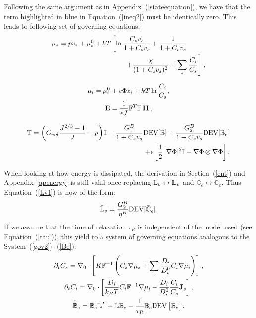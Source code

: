 Following the same argument as in Appendix~(\ref{stateequation}), we have that the term highlighted in blue in Equation~(\ref{ineq2}) must be identically zero. This leads to following set of governing equations:
\begin{gather}
\begin{aligned}
\mu_s = p v_s + \mu_s^0 + kT&\left[\ln \frac{C_s v_s}{1+C_s v_s} + \frac{1}{1+C_sv_s}\right.\\
&\left.\ \ \ \ \ \ +\frac{\chi}{(1+C_s v_s)^2}-\sum_i \frac{C_i}{C_s}\right], 
\end{aligned}\\[2.5mm]
\mu_i = \mu^0_i + e\Phi z_i + kT \ln \frac{C_i}{C_s},\\
\mathbf{E} = \frac{1}{\epsilon J} \mathbb{F}^T \mathbb{F}\, \mathbf{H}\,, \\[3mm]
\begin{aligned}
\mathbb{T}= \left(G_{vol}\dfrac{J^{2/3}-1}{J}-p\right) \mathbb{I} + \frac{G^B_1}{1+C_sv_s}\text{DEV}[\bar{\mathbb{B}}] + \frac{G^B_2}{1+C_sv_s}\text{DEV}[\bar{\mathbb{B}}_e]\\
+ \epsilon \left[\frac{1}{2} \,|\nabla \Phi|^2\mathbb{I} -\nabla \Phi \otimes \nabla \Phi\right],\label{sys2B}
\end{aligned}
\end{gather}

When looking at how energy is dissipated, the derivation in Section~(\ref{ent}) and Appendix~\ref{apenergy} is still valid once replacing $\mathbb{L}_v\leftrightarrow \bar{\mathbb{L}}_v$ and $\mathbb{C}_e\leftrightarrow\mathbb{\bar{C}}_e$. Thus Equation~(\ref{Lv1}) is now of the form:
\begin{equation}
\bar{\mathbb{L}}_v = \frac{G^B_2}{\eta^B} \text{DEV}[\bar{\mathbb{C}}_e].\label{Lv2}
\end{equation}
If we assume that the time of relaxation $\tau_R$ is independent of the model used (see Equation~(\ref{tau})), this yield to a system of governing equations analogous to the System~(\ref{gov2})- (\ref{Be}):
\begin{gather}
\partial_t C_s=\nabla_0 \cdot\left[K \mathbb{F}^{-1}\left(C_s\nabla \mu_s +\sum_i \frac{D_i}{D^0_i} C_i \nabla \mu_i\right)\right],\\
\partial_t C_i= \nabla_0\cdot\left[\frac{D_i}{k_B T}C_i\mathbb{F}^{-1}\nabla \mu_i -\frac{D_i}{D^0_i} \frac{C_i}{C_s} \mathbf{J}_s\right],\\
\dot{\bar{\mathbb{B}}}_e = \bar{\mathbb{B}}_e \bar{\mathbb{L}}^T +\bar{\mathbb{L}} \bar{\mathbb{B}}_e -\frac{1}{\tau_R} \bar{\mathbb{B}}_e \text{DEV}\left[\bar{\mathbb{B}}_e\right].\label{BeB}
\end{gather}

